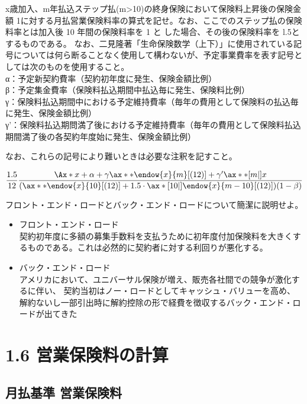 \documentclass[report,gutter=10mm,fore-edge=10mm,uplatex,dvipdfmx]{jlreq}
\begin{document}
x歳加入、m年払込ステップ払(m\textgreater10)の終身保険において保険料上昇後の保険金額
1に対する月払営業保険料率の算式を記せ。なお、ここでのステップ払の保険料率とは加入後
10 年間の保険料率を 1 と した場合、その後の保険料率を l.5とするものである。
なお、二見隆著「生命保険数学（上下）」に使用されている記号については何ら断ることなく使用して構わないが、予定事業費率を表す記号としては次のものを使用すること。\\
α：予定新契約費率（契約初年度に発生、保険金額比例）\\
β：予定集金費率（保険料払込期間中払込毎に発生、保険料比例）\\
γ：保険料払込期間中における予定維持費率（毎年の費用として保険料の払込毎に発生、保険金額比例）\\
γ'：保険料払込期問満了後における予定維持費率（毎年の費用として保険料払込期間満了後の各契約年度始に発生、保険金額比例）

なお、これらの記号により難いときは必要な注釈を記すこと。



\[
\frac{1.5}{12}
\frac{\Ax*{x}+\alpha+\gamma \ax**{\endow{x}{m}}[(12)]+\gamma' \ax**[m|]{x}}{(\ax**{\endow{x}{10}}[(12)]+1.5\cdot\ax*[10|]{\endow{x}{m-10}}[(12)])(1-\beta)}
\]



フロント・エンド・ロードとバック・エンド・ロードについて簡潔に説明せよ。



\begin{itemize}
\tightlist
\item
  フロント・エンド・ロード\\
契約初年度に多額の募集手数料を支払うために初年度付加保険料を大きくするものである。これは必然的に契約者に対する利回りが悪化する。
\item
  バック・エンド・ロード\\
  アメリカにおいて、ユニバーサル保険が増え、販売各社間での競争が激化するに伴い、
契約当初はノー・ロードとしてキャッシュ・バリューを高め、解約ないし一部引出時に解約控除の形で経費を徴収するバック・エンド・ロードが出てきた
  
\end{itemize}


\section{1.6
営業保険料の計算}

\subsection{月払基準 営業保険料}
\end{document}
